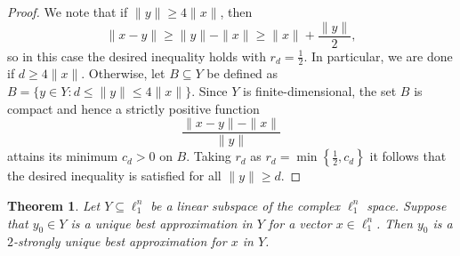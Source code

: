 \documentclass[12pt, reqno]{amsart}
\newtheorem{twr}{Theorem}[section]
\theoremstyle{definition}
\theoremstyle{remark}
\numberwithin{equation}{section}
\begin{document}
\begin{proof}
We note that if $\| y\| \geq 4\|x\|$, then
$$\|x-y\| \geq \|y\| - \|x\| \geq \|x\| + \frac{\|y\|}{2},$$
so in this case the desired inequality holds with $r_d = \frac{1}{2}$. In particular, we are done if $d \geq 4 \|x\|$. Otherwise, let $B \subseteq Y$ be defined as $B = \{ y \in Y: d \leq \|y\| \leq 4\|x\| \}$. Since $Y$ is finite-dimensional, the set $B$ is compact and hence a strictly positive function
$$\frac{\|x-y\|-\|x\|}{\|y\|}$$
attains its minimum $c_d>0$ on $B$. Taking $r_d$ as $r_d=\min \left \{ \frac{1}{2}, c_d \right \}$ it follows that the desired inequality is satisfied for all $\|y\| \geq d$.
\end{proof}

\begin{twr}
\label{twrl1}
Let $Y \subseteq \ell_{1}^n$ be a linear subspace of the complex $\ell_1^n$ space. Suppose that $y_0 \in Y$ is a unique best approximation in $Y$ for a vector $x \in \ell_{1}^n$. Then $y_0$ is a $2$-strongly unique best approximation for $x$ in $Y$.
\end{twr}
\end{document}
